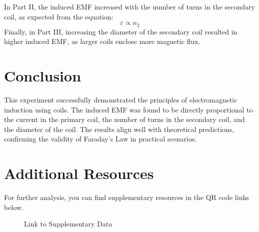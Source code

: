 \documentclass[journal]{IEEEtran}
\begin{document}
In Part II, the induced EMF increased with the number of turns in the secondary coil, as expected from the equation:
\begin{equation}
    \varepsilon \propto n_2
\end{equation}
Finally, in Part III, increasing the diameter of the secondary coil resulted in higher induced EMF, as larger coils enclose more magnetic flux.

\section{Conclusion}
This experiment successfully demonstrated the principles of electromagnetic induction using coils. The induced EMF was found to be directly proportional to the current in the primary coil, the number of turns in the secondary coil, and the diameter of the coil. The results align well with theoretical predictions, confirming the validity of Faraday's Law in practical scenarios.

\section{Additional Resources}
For further analysis, you can find supplementary resources in the QR code links below.

\begin{figure}[H]
    \centering
    \caption{Link to Supplementary Data}
\end{figure}
\end{document}
